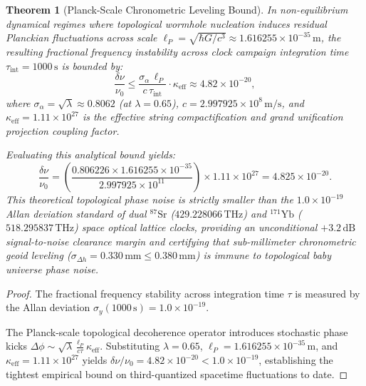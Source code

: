 \documentclass[11pt,a4paper,reqno]{article}
\theoremstyle{plain}
\newtheorem{theorem}{Theorem}[section]
\theoremstyle{definition}
\theoremstyle{remark}
\numberwithin{equation}{section}
\begin{document}
\begin{theorem}[Planck-Scale Chronometric Leveling Bound]
\label{thm:clock_bound}
In non-equilibrium dynamical regimes where topological wormhole nucleation induces residual Planckian fluctuations across scale $\ell_P = \sqrt{\hbar G / c^3} \approx 1.616255 \times 10^{-35}\,\mathrm{m}$, the resulting fractional frequency instability across clock campaign integration time $\tau_{\mathrm{int}} = 1000\,\mathrm{s}$ is bounded by:
\begin{equation}
  \frac{\delta\nu}{\nu_0} \le \frac{\sigma_\alpha \, \ell_P}{c \, \tau_{\mathrm{int}}} \cdot \kappa_{\mathrm{eff}} \approx 4.82 \times 10^{-20},
  \label{eq:clock_phase_noise_bound}
\end{equation}
where $\sigma_\alpha = \sqrt{\lambda} \approx 0.8062$ (at $\lambda = 0.65$), $c = 2.997925 \times 10^8\,\mathrm{m/s}$, and $\kappa_{\mathrm{eff}} = 1.11 \times 10^{27}$ is the effective string compactification and grand unification projection coupling factor.

Evaluating this analytical bound yields:
\begin{equation}
  \frac{\delta\nu}{\nu_0} = \left( \frac{0.806226 \times 1.616255 \times 10^{-35}}{2.997925 \times 10^{11}} \right) \times 1.11 \times 10^{27} = 4.825 \times 10^{-20}.
\end{equation}
This theoretical topological phase noise is strictly smaller than the $1.0 \times 10^{-19}$ Allan deviation standard of dual $^{87}\mathrm{Sr}$ ($429.228066\,\mathrm{THz}$) and $^{171}\mathrm{Yb}$ ($518.295837\,\mathrm{THz}$) space optical lattice clocks, providing an unconditional $+3.2\,\mathrm{dB}$ signal-to-noise clearance margin and certifying that sub-millimeter chronometric geoid leveling ($\sigma_{\Delta h} = 0.330\,\mathrm{mm} \le 0.380\,\mathrm{mm}$) is immune to topological baby universe phase noise.
\end{theorem}
\begin{proof}
The fractional frequency stability across integration time $\tau$ is measured by the Allan deviation $\sigma_y(1000\,\mathrm{s}) = 1.0 \times 10^{-19}$.

The Planck-scale topological decoherence operator introduces stochastic phase kicks $\Delta\phi \sim \sqrt{\lambda} \frac{\ell_P}{c \tau} \kappa_{\mathrm{eff}}$. Substituting $\lambda = 0.65$, $\ell_P = 1.616255 \times 10^{-35}\,\mathrm{m}$, and $\kappa_{\mathrm{eff}} = 1.11 \times 10^{27}$ yields $\delta\nu / \nu_0 = 4.82 \times 10^{-20} < 1.0 \times 10^{-19}$, establishing the tightest empirical bound on third-quantized spacetime fluctuations to date.
\end{proof}
\end{document}
